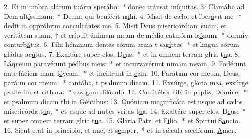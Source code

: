 2. Et in umbra alárum tuárm sper\uline{á}bo:~* donec tránsat in\uline{í}quitas.
3. Clamábo ad Dem alt\uline{í}ssimum:~* Deum, qui benfécit m\uline{i}hi.
4. Misit de cælo, et lber\uline{á}vit me:~* dedit in oppróbrim conculc\uline{á}ntes me.
5. Misit Deus misericórdiam suam, et veritátem suam,~† et erípuit ánimam meam de médio catulórm le\uline{ó}num:~* dormív conturb\uline{á}tus.
6. Fílii hóminum dentes eórum arma t sag\uline{í}ttæ:~* et lingua eórum gládus ac\uline{ú}tus.
7. Exaltáre super clos, D\uline{e}us:~* et in omnem terram glria t\uline{u}a.
8. Láqueum paravérunt pédbus m\uline{e}is:~* et incurvavérunt nimam m\uline{e}am.
9. Fodérunt ante fáciem mam f\uline{ó}veam:~* et incidrunt in \uline{e}am.
10. Parátum cor meum, Deus, parátm cor m\uline{e}um:~* cantábo, t psalmum d\uline{i}cam.
11. Exsúrge, glória mea, exsúrge psaltérim et c\uline{í}thara:~* exsrgam dil\uline{ú}culo.
12. Confitébor tibi in póplis, D\uline{ó}mine:~* et psalmum dicam tbi in G\uline{é}ntibus:
13. Quóniam magnificáta est usque ad cælos misericórda t\uline{u}a,~* et usque ad nubes vritas t\uline{u}a.
14. Exaltáre super clos, D\uline{e}us:~* et super omnem terram glria t\uline{u}a.
15. Glória Patr, et F\uline{í}lio,~* et Spirtui S\uline{a}ncto.
16. Sicut erat in princípio, et nnc, et s\uline{e}mper,~* et in sǽcula sæclórum. \uline{A}men.
